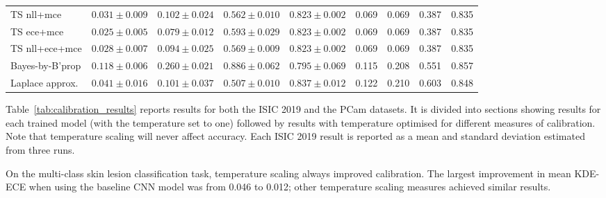 \begin{table}[h!]
{\begin{tabular}{l|cccc|m{0.8cm}m{0.8cm}m{0.8cm}m{0.8cm}|}
			TS nll+mce & \multicolumn{1}{c|}{$0.031 \pm 0.009$}& \multicolumn{1}{c|}{$0.102 \pm 0.024$}& \multicolumn{1}{c|}{$0.562 \pm 0.010$}& \multicolumn{1}{c|}{$0.823 \pm 0.002$}& \multicolumn{1}{c|}{0.069} & \multicolumn{1}{c|}{0.069} & \multicolumn{1}{c|}{0.387} & \multicolumn{1}{c|}{0.835} \\
			TS ece+mce & \multicolumn{1}{c|}{$0.025 \pm 0.005$}& \multicolumn{1}{c|}{$0.079 \pm 0.012$}& \multicolumn{1}{c|}{$0.593 \pm 0.029$}& \multicolumn{1}{c|}{$0.823 \pm 0.002$}& \multicolumn{1}{c|}{0.069} & \multicolumn{1}{c|}{0.069} & \multicolumn{1}{c|}{0.387} & \multicolumn{1}{c|}{0.835} \\
			TS nll+ece+mce & \multicolumn{1}{c|}{$0.028 \pm 0.007$}& \multicolumn{1}{c|}{$0.094 \pm 0.025$}& \multicolumn{1}{c|}{$0.569 \pm 0.009$}& \multicolumn{1}{c|}{$0.823 \pm 0.002$}& \multicolumn{1}{c|}{0.069} & \multicolumn{1}{c|}{0.069} & \multicolumn{1}{c|}{0.387} & \multicolumn{1}{c|}{0.835} \\ \hline \hline
			Bayes-by-B'prop & \multicolumn{1}{c|}{$0.118 \pm 0.006$}& \multicolumn{1}{c|}{$0.260 \pm 0.021$}& \multicolumn{1}{c|}{$0.886 \pm 0.062$}& \multicolumn{1}{c|}{$0.795 \pm 0.069$}& \multicolumn{1}{c|}{0.115} & \multicolumn{1}{c|}{0.208} & \multicolumn{1}{c|}{0.551} & \multicolumn{1}{c|}{0.857} \\ 
			Laplace approx.& \multicolumn{1}{c|}{$0.041 \pm 0.016$}& \multicolumn{1}{c|}{$0.101 \pm 0.037$}& \multicolumn{1}{c|}{$0.507 \pm 0.010$}& \multicolumn{1}{c|}{$0.837 \pm 0.012$}& \multicolumn{1}{c|}{0.122} & \multicolumn{1}{c|}{0.210} & \multicolumn{1}{c|}{0.603} & \multicolumn{1}{c|}{0.848} \\\hline
		\end{tabular}%
	}
\end{table}

Table~\ref{tab:calibration_results} reports results for both the ISIC 2019 and the PCam datasets. It is divided into sections showing results for each trained model (with the temperature set to one) followed by results with temperature optimised for different measures of calibration. Note that temperature scaling will never affect accuracy. Each ISIC 2019 result is reported as a mean and standard deviation estimated from three runs.

On the multi-class skin lesion classification task, temperature scaling always improved calibration. The largest improvement in mean KDE-ECE when using the baseline CNN model was from 0.046 to 0.012; other temperature scaling measures achieved similar results. 

